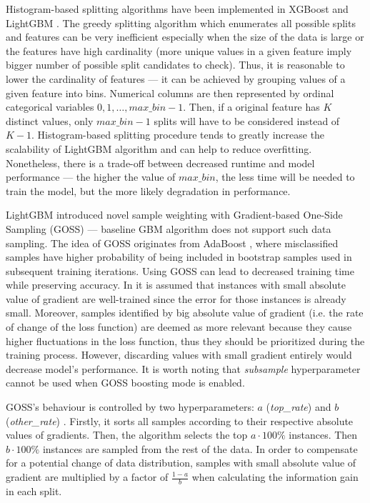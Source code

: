 \documentclass[magisterska, english]{pwr_wmat_praca_dyplomowa}
\theoremstyle{plain}
\numberwithin{theorem}{chapter}
\theoremstyle{definition}
\numberwithin{theorem}{chapter}
\begin{document}
Histogram-based splitting algorithms have been implemented in XGBoost \cite{xgboost} and LightGBM \cite{lightgbm}. The greedy splitting algorithm which enumerates all possible splits and features can be very inefficient especially when the size of the data is large or the features have high cardinality (more unique values in a given feature imply bigger number of possible split candidates to check). Thus, it is reasonable to lower the cardinality of features --- it can be achieved by grouping values of a given feature into bins. Numerical columns are then represented by ordinal categorical variables $0,1,\ldots,max\_bin-1$. Then, if a original feature has $K$ distinct values, only $max\_bin-1$ splits will have to be considered instead of $K-1$. Histogram-based splitting procedure tends to greatly increase the scalability of LightGBM algorithm and can help to reduce overfitting. Nonetheless, there is a trade-off between decreased runtime and model performance --- the higher the value of $max\_bin$, the less time will be needed to train the model, but the more likely degradation in performance.

LightGBM introduced novel sample weighting with Gradient-based One-Side Sampling (GOSS) --- baseline GBM algorithm \cite{friedman_gbm} does not support such data sampling. The idea of GOSS originates from AdaBoost \cite{adaboost}, where misclassified samples have higher probability of being included in bootstrap samples used in subsequent training iterations. Using GOSS can lead to decreased training time while preserving accuracy. In \cite{lightgbm} it is assumed that instances with small absolute value of gradient are well-trained since the error for those instances is already small. Moreover, samples identified by big absolute value of gradient (i.e. the rate of change of the loss function) are deemed as more relevant because they cause higher fluctuations in the loss function, thus they should be prioritized during the training process. However, discarding values with small gradient entirely would decrease model's performance. It is worth noting that \emph{subsample} hyperparameter cannot be used when GOSS boosting mode is enabled.

GOSS's behaviour is controlled by two hyperparameters: $a$ (\emph{top\_rate}) and $b$ (\emph{other\_rate}) \cite{lightgbm}. Firstly, it sorts all samples according to their respective absolute values of gradients. Then, the algorithm selects the top $a\cdot 100\%$ instances. Then $b\cdot 100\%$ instances are sampled from the rest of the data. In order to compensate for a potential change of data distribution, samples with small absolute value of gradient are multiplied by a factor of $\frac{1-a}{b}$ when calculating the information gain in each split.
\end{document}
